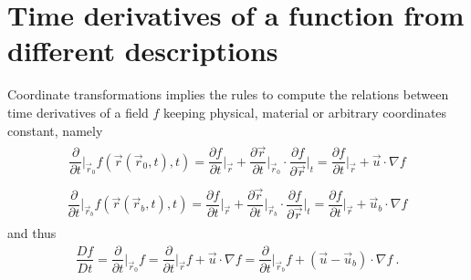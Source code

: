 \documentclass[letterpaper,10pt,english]{jupyterBook}
\begin{document}
\section{Time derivatives of a function from different descriptions}
\label{\detokenize{ch/continuum/kinematics:time-derivatives-of-a-function-from-different-descriptions}}\label{\detokenize{ch/continuum/kinematics:continuum-kinematics-function-derivatives}}
\sphinxAtStartPar
Coordinate transformations implies the rules to compute the relations between time derivatives of a field \(f\) keeping physical, material or arbitrary coordinates constant, namely
\begin{equation*}
\begin{split}\begin{aligned}
\dfrac{\partial}{\partial t}\bigg|_{\vec{r}_0} f(\vec{r}(\vec{r}_0, t), t) 
    = \dfrac{\partial f}{\partial t}\bigg|_{\vec{r}} +
    \dfrac{\partial \vec{r}}{\partial t}\bigg|_{\vec{r}_0} \cdot \dfrac{\partial f}{\partial \vec{r}}\bigg|_{t} 
    = \dfrac{\partial f}{\partial t}\bigg|_{\vec{r}} +
      \vec{u} \cdot \nabla f 
\end{aligned}\end{split}
\end{equation*}\begin{equation*}
\begin{split}\begin{aligned}
\dfrac{\partial}{\partial t}\bigg|_{\vec{r}_b} f(\vec{r}(\vec{r}_b, t), t) 
    = \dfrac{\partial f}{\partial t}\bigg|_{\vec{r}} +
    \dfrac{\partial \vec{r}}{\partial t}\bigg|_{\vec{r}_b} \cdot \dfrac{\partial f}{\partial \vec{r}}\bigg|_{t} 
    = \dfrac{\partial f}{\partial t}\bigg|_{\vec{r}} +
      \vec{u}_b \cdot \nabla f 
\end{aligned}\end{split}
\end{equation*}
\sphinxAtStartPar
and thus
\begin{equation}\label{equation:ch/continuum/kinematics:eq:field-time-derivatives}
\begin{split}
\dfrac{D f}{D t} = \dfrac{\partial}{\partial t}\bigg|_{\vec{r}_0} f =  
\dfrac{\partial}{\partial t}\bigg|_{\vec{r}  } f + \vec{u} \cdot \nabla f =  
\dfrac{\partial}{\partial t}\bigg|_{\vec{r}_b} f + ( \vec{u} - \vec{u}_b ) \cdot \nabla f \ . 
\end{split}
\end{equation}
\end{document}
